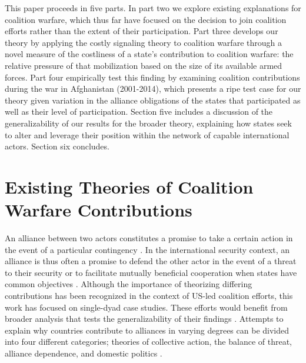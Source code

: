 \documentclass[12pt,letterpaper]{article}
\begin{document}
	This paper proceeds in five parts. In part two we explore existing explanations for coalition warfare, which thus far have focused on the decision to join coalition efforts rather than the extent of their participation. Part three develops our theory by applying the costly signaling theory to coalition warfare through a novel measure of the costliness of a state's contribution to coalition warfare: the relative pressure of that mobilization based on the size of its available armed forces. Part four empirically test this finding by examining coalition contributions during the war in Afghanistan (2001-2014), which presents a ripe test case for our theory given variation in the alliance obligations of the states that participated as well as their level of participation. Section five includes a discussion of the generalizability of our results for the broader theory, explaining how states seek to alter and leverage their position within the network of capable international actors. Section six concludes.

\section{Existing Theories of Coalition Warfare Contributions}
	An alliance between two actors constitutes a promise to take a certain action in the event of a particular contingency \citep[526]{altfeld_decisionallytheory_1984}. In the international security context, an alliance is thus often a promise to defend the other actor in the event of a threat to their security \citep{waltz_theoryinternationalpolitics_1979, walt_originsalliance_1987} or to facilitate mutually beneficial cooperation when states have common objectives \citep{keohane_hegemonycooperationdiscord_1984, wolford_showing_2014}. Although the importance of theorizing differing contributions has been recognized in the context of US-led coalition efforts, this work has focused on single-dyad case studies. These efforts would benefit from broader analysis that tests the generalizability of their findings \citep[4-5]{mello_politicsmultinationalmilitary_2018}. Attempts to explain why countries contribute to alliances in varying degrees can be divided into four different categories; theories of collective action, the balance of threat, alliance dependence, and domestic politics \citep{bennett_burdensharingpersiangulf_1994, haesebrouck_democraticparticipationair_2016}.
	
\end{document}
